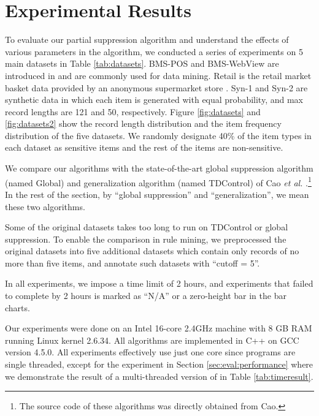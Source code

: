 \section{Experimental Results}
\label{sec:eval}

To evaluate our partial suppression algorithm and understand the effects of
various parameters in the algorithm, we conducted a series of experiments
on 5 main datasets in Table \ref{tab:datasets}. BMS-POS and
BMS-WebView are introduced in \cite{Zheng:2001:RWP:502512.502572} and are
commonly used for data mining. Retail is the retail market basket data
provided by an anonymous supermarket store \cite{brijs99:retailData}.
Syn-1 and Syn-2 are synthetic data in which each item is generated with
equal probability, and max record lengths are 121 and 50, respectively.
Figure \ref{fig:datasets} and \ref{fig:datasets2} show
the record length distribution and the item frequency distribution of the five
 datasets. We randomly designate 40\% of the item types in each dataset as
sensitive items and the rest of the items are non-sensitive.

We compare our algorithms with the state-of-the-art global suppression
algorithm (named Global) and generalization algorithm (named TDControl) of
Cao {\em et al.}
\cite{Cao:2010:rho}.\footnote{The source code of these algorithms
was directly obtained from Cao.}
In the rest of the section, by ``global suppression'' and
``generalization'', we mean these two algorithms.

Some of the original datasets takes too long to run on
TDControl or global suppression. To enable the comparison in rule
mining, we preprocessed the original datasets into
five additional datasets which contain only records of no more than
five items, and annotate such datasets with ``cutoff = 5''.

In all experiments, we impose a time limit of
2 hours, and experiments that failed to complete by 2 hours is marked
as ``N/A'' or a zero-height bar in the bar charts.


Our experiments were done on an Intel 16-core 2.4GHz machine with
8 GB RAM running Linux kernel 2.6.34. All algorithms are
implemented in C++ on GCC version 4.5.0.
All experiments effectively use just one core since programs are single
threaded, except for the experiment in Section \ref{sec:eval:performance}
where we demonstrate the result of a multi-threaded version of
\PartialR in Table \ref{tab:timeresult}.

